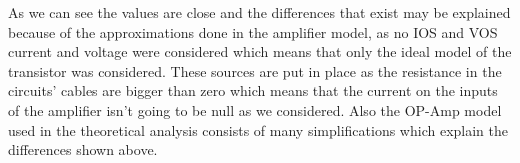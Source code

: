 \par As we can see the values are close and the differences that exist may be explained because of the approximations done in the amplifier model, as no IOS and VOS current and voltage were considered which means that only the ideal model of the transistor was considered. These sources are put in place as the resistance in the circuits' cables are bigger than zero which means that the current on the inputs of the amplifier isn't going to be null as we considered. Also the OP-Amp model used in the theoretical analysis consists of many simplifications which explain the differences shown above.
\newpage

